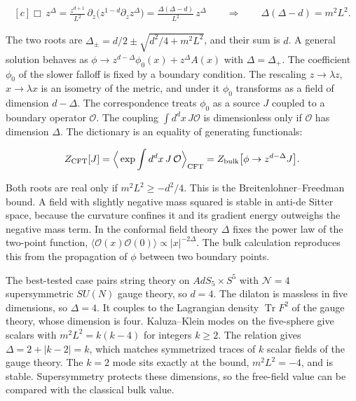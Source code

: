 \documentclass[11pt,oneside]{book}
\newenvironment{centeredalign}{\[\begin{gathered}[c]}{\end{gathered}\]}
\begin{document}
\begin{centeredalign}
\Box\,z^\Delta=\frac{z^{d+1}}{L^2}\,\partial_z\big(z^{1-d}\partial_z z^\Delta\big)
=\frac{\Delta(\Delta-d)}{L^2}\,z^\Delta
\qquad\Rightarrow\qquad \Delta(\Delta-d)=m^2L^2.
\end{centeredalign}

The two roots are \(\Delta_\pm=d/2\pm\sqrt{d^2/4+m^2L^2}\), and their sum is \(d\). A general solution behaves as \(\phi\to z^{d-\Delta}\phi_0(x)+z^{\Delta}A(x)\) with \(\Delta=\Delta_+\). The coefficient \(\phi_0\) of the slower falloff is fixed by a boundary condition. The rescaling \(z\to\lambda z\), \(x\to\lambda x\) is an isometry of the metric, and under it \(\phi_0\) transforms as a field of dimension \(d-\Delta\). The correspondence treats \(\phi_0\) as a source \(J\) coupled to a boundary operator \(\mathcal O\). The coupling \(\int d^dx\,J\mathcal O\) is dimensionless only if \(\mathcal O\) has dimension \(\Delta\). The dictionary is an equality of generating functionals:

\begin{centeredalign}
Z_{\rm CFT}[J]=\Big\langle \exp\int d^dx\,J\,\mathcal O\Big\rangle_{\rm CFT}
=Z_{\rm bulk}\big[\phi\to z^{d-\Delta}J\big].
\end{centeredalign}

Both roots are real only if \(m^2L^2\geq-d^2/4\). This is the Breitenlohner--Freedman bound. A field with slightly negative mass squared is stable in anti-de Sitter space, because the curvature confines it and its gradient energy outweighs the negative mass term. In the conformal field theory \(\Delta\) fixes the power law of the two-point function, \(\langle\mathcal O(x)\mathcal O(0)\rangle\propto|x|^{-2\Delta}\). The bulk calculation reproduces this from the propagation of \(\phi\) between two boundary points.

The best-tested case pairs string theory on \(AdS_5\times S^5\) with \(\mathcal N=4\) supersymmetric \(SU(N)\) gauge theory, so \(d=4\). The dilaton is massless in five dimensions, so \(\Delta=4\). It couples to the Lagrangian density \(\operatorname{Tr}F^2\) of the gauge theory, whose dimension is four. Kaluza--Klein modes on the five-sphere give scalars with \(m^2L^2=k(k-4)\) for integers \(k\geq2\). The relation gives \(\Delta=2+|k-2|=k\), which matches symmetrized traces of \(k\) scalar fields of the gauge theory. The \(k=2\) mode sits exactly at the bound, \(m^2L^2=-4\), and is stable. Supersymmetry protects these dimensions, so the free-field value can be compared with the classical bulk value.
\end{document}
